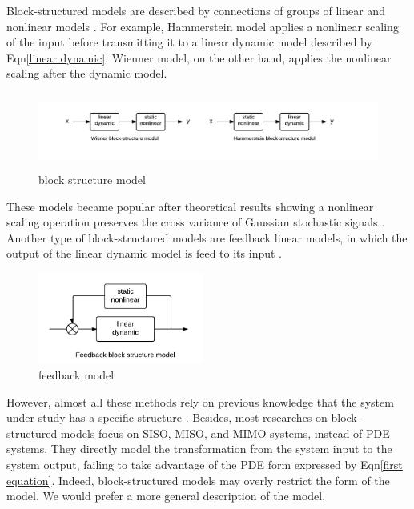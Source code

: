 \documentclass[a4paper,onecolumn]{article}
\theoremstyle{remark}
\begin{document}
\noindent Block-structured models are described by connections of groups of linear 
and nonlinear models \cite{NARMAXbook}.
For example, Hammerstein model applies a nonlinear scaling of the input before transmitting
it to a linear dynamic model described by Eqn\eqref{linear dynamic}.
Wienner model, on the other hand, applies the nonlinear scaling after the dynamic model.
\begin{figure}[H]\begin{center}
    \includegraphics[height=2.5cm]{blockstructure.png}
    \caption{block structure model}
\end{center} \label{Wiener}
\end{figure}
\vspace{-.5cm}
\noindent 
These models became popular after theoretical results showing a nonlinear scaling operation 
preserves the cross variance of Gaussian stochastic signals \cite{cross correlation}. 
Another type of block-structured models are feedback linear models, in which the output
of the linear dynamic model is feed to its input \cite{feedback linear}.
\begin{figure}[H]\begin{center}
    \includegraphics[height=3cm]{feedback.png}
    \caption{feedback model}
\end{center} \label{Wiener}
\end{figure}
\vspace{-.5cm}
\noindent 
However, almost all these methods rely on previous knowledge that the system under study
has a specific structure \cite{NARMAXbook}. Besides,
most researches on block-structured models focus on SISO, MISO, and MIMO systems,
instead of PDE systems.
They directly model the transformation from the system input to the
system output, failing to take advantage of the PDE form expressed by Eqn\eqref{first equation}. 
Indeed, block-structured models may overly restrict the form of the model.
We would prefer a more general description of the model.
\\
\end{document}
